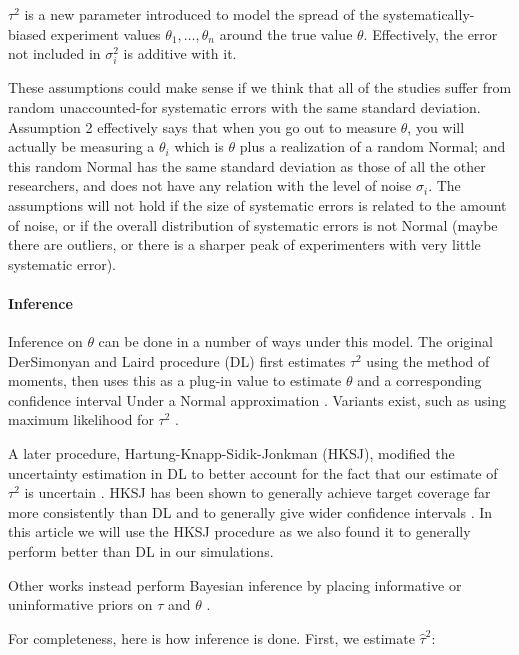 \documentclass[letterpaper,12pt]{article}
\begin{document}
$\tau^2$ is a new parameter introduced to model the spread of the systematically-biased experiment values $\theta_1,\ldots,\theta_n$ around the true value $\theta$. Effectively, the error not included in $\sigma_i^2$ is additive with it.

These assumptions could make sense if we think that all of the studies suffer from random unaccounted-for systematic errors with the same standard deviation. Assumption 2 effectively says that when you go out to measure $\theta$, you will actually be measuring a $\theta_i$ which is $\theta$ plus a realization of a random Normal; and this random Normal has the same standard deviation as those of all the other researchers, and does not have any relation with the level of noise $\sigma_i$. The assumptions will not hold if the size of systematic errors is related to the amount of noise, or if the overall distribution of systematic errors is not Normal (maybe there are outliers, or there is a sharper peak of experimenters with very little systematic error).

\paragraph{Inference}\label{inference}

Inference on $\theta$ can be done in a number of ways under this model. The original DerSimonyan and Laird procedure (DL) first estimates $\tau^2$ using the method of moments, then uses this as a plug-in value to estimate $\theta$ and a corresponding confidence interval Under a Normal approximation \citep{dersimonian1986meta}. Variants exist, such as using maximum likelihood for $\tau^2$ \citep{dersimonian1986meta,jackson2010does}.

A later procedure, Hartung-Knapp-Sidik-Jonkman (HKSJ), modified the uncertainty estimation in DL to better account for the fact that our estimate of $\tau^2$ is uncertain \citep{hartung1999alternative,sidik2002simple}. HKSJ has been shown to generally achieve target coverage far more consistently than DL \citep{inthout2014hartung} and to generally give wider confidence intervals \citep{wiksten2016hartung}. In this article we will use the HKSJ procedure as we also found it to generally perform better than DL in our simulations.

Other works instead perform Bayesian inference by placing informative or uninformative priors on $\tau$ and $\theta$ \citep{sutton2001bayesian}.

For completeness, here is how inference is done. First, we estimate $\hat\tau^2$:
\end{document}
